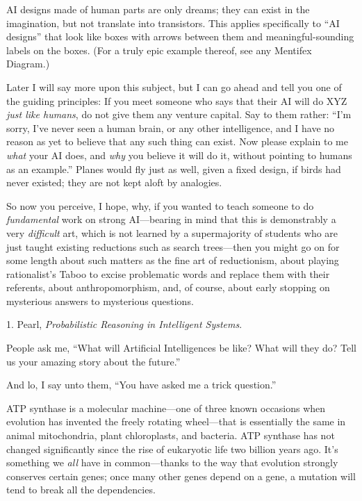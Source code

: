 {
 AI designs made of human parts are only dreams; they can exist in
the imagination, but not translate into transistors. This applies
specifically to ``AI designs'' that
look like boxes with arrows between them and meaningful-sounding labels
on the boxes. (For a truly epic example thereof, see any Mentifex
Diagram.)}

{
 Later I will say more upon this subject, but I can go ahead and
tell you one of the guiding principles: If you meet someone who says
that their AI will do XYZ \textit{just like humans}, do not give them
any venture capital. Say to them rather:
``I'm sorry, I've
never seen a human brain, or any other intelligence, and I have no
reason as yet to believe that any such thing can exist. Now please
explain to me \textit{what} your AI does, and \textit{why} you believe
it will do it, without pointing to humans as an
example.'' Planes would fly just as well, given a
fixed design, if birds had never existed; they are not kept aloft by
analogies.}

{
 So now you perceive, I hope, why, if you wanted to teach someone
to do \textit{fundamental} work on strong AI---bearing in mind that
this is demonstrably a very \textit{difficult} art, which is not
learned by a supermajority of students who are just taught existing
reductions such as search trees---then you might go on for some length
about such matters as the fine art of reductionism, about playing
rationalist's Taboo to excise problematic words and
replace them with their referents, about anthropomorphism, and, of
course, about early stopping on mysterious answers to mysterious
questions.}

\myendsectiontext


\bigskip

{
 1. Pearl, \textit{Probabilistic Reasoning in Intelligent
Systems}.}


{
 People ask me, ``What will Artificial
Intelligences be like? What will they do? Tell us your amazing story
about the future.'' }

{
 And lo, I say unto them, ``You have asked me a
trick question.''}

{
 ATP synthase is a molecular machine---one of three known occasions
when evolution has invented the freely rotating wheel---that is
essentially the same in animal mitochondria, plant chloroplasts, and
bacteria. ATP synthase has not changed significantly since the rise of
eukaryotic life two billion years ago. It's something
we \textit{all} have in common---thanks to the way that evolution
strongly conserves certain genes; once many other genes depend on a
gene, a mutation will tend to break all the dependencies.}


